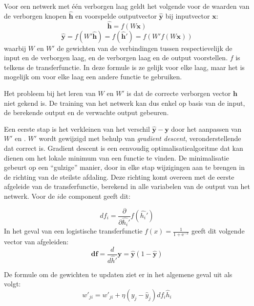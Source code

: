 Voor een netwerk met \'e\'en verborgen laag geldt het volgende voor de waarden van de verborgen knopen $\mathbf{\hat{h}}$ en voorspelde outputvector $\mathbf{\hat{y}}$ bij inputvector $\mathbf{x}$:
\begin{equation}
    \mathbf{\hat{h}} = f(W\mathbf{x})
\end{equation}
\begin{equation}
    \boldsymbol{\hat{y}} = f(W'\mathbf{\hat{h}}) = f(\boldsymbol{\hat{h}'}) = f(W'f(W\boldsymbol{x}))
\end{equation}
waarbij ${W}$ en ${W'}$ de gewichten van de verbindingen tussen respectievelijk de input en de verborgen laag, en de verborgen laag en de output voorstellen. $f$ is telkens de transferfunctie. In deze formule is ze gelijk voor elke laag, maar het is mogelijk om voor elke laag een andere functie te gebruiken.

Het probleem bij het leren van ${W}$ en ${W'}$ is dat de correcte verborgen vector $\mathbf{h}$ niet gekend is. De training van het netwerk kan dus enkel op basis van de input, de  berekende output en de verwachte output gebeuren.

Een eerste stap is het verkleinen van het verschil $\mathbf{\hat{y}} - \mathbf{y}$ door het aanpassen van $W'$ en . $W'$ wordt gewijzigd met behulp van \emph{gradient descent}, veronderstellende dat  correct is. Gradient descent is een eenvoudig optimalisatiealgoritme dat kan dienen om het lokale minimum van een functie te vinden. De minimalisatie gebeurt op een ``gulzige'' manier, door in elke stap wijzigingen aan te brengen in de richting van de steilste afdaling. Deze richting komt overeen met de eerste afgeleide van de transferfunctie, berekend in alle variabelen van de output van het netwerk. Voor de $i$de component geeft dit:

\begin{equation}
df_i = \frac{\partial}{\partial\hat{h_i}'}f(\hat{h_i}')
\end{equation}
In het geval van een logistische transferfunctie $f(x) = \frac{1}{1 + \mathrm e^{-x}}$ geeft dit volgende vector van afgeleiden:
\begin{equation}
  \mathbf{df} = \frac{d}{d\hat{h}'}\mathbf{\hat{y}} = \mathbf{\hat{y}}(1-\mathbf{\hat{y}})
\end{equation}

De formule om de gewichten te updaten ziet er in het algemene geval uit als volgt:
\begin{equation}
  w'_{ji} = w'_{ji} + \eta(y_j-\hat{y}_j)df_i\hat{h}_i
\end{equation}

